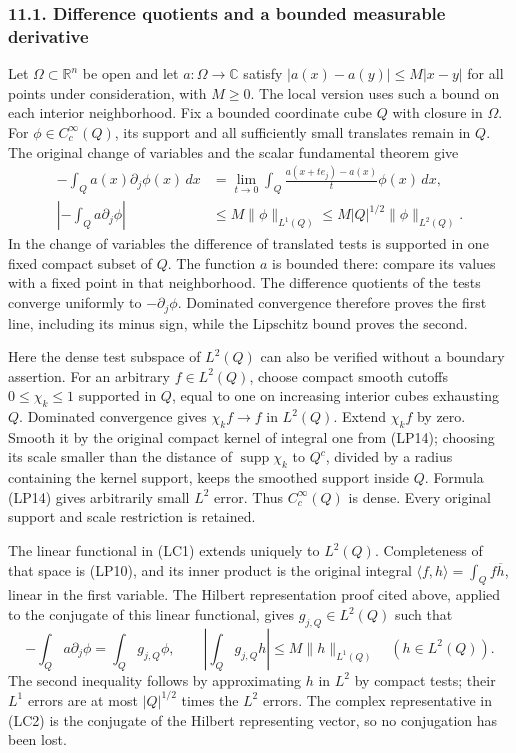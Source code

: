 \documentclass[
  11pt,
]{article}
\begin{document}
\subsubsection{11.1. Difference quotients and a bounded measurable
derivative}\label{difference-quotients-and-a-bounded-measurable-derivative}

Let \(\Omega\subset\mathbb R^n\) be open and let
\(a:\Omega\to\mathbb C\) satisfy \(|a(x)-a(y)|\leq M|x-y|\) for all
points under consideration, with \(M\geq0\). The local version uses such
a bound on each interior neighborhood. Fix a bounded coordinate cube
\(Q\) with closure in \(\Omega\). For \(\phi\in C_c^\infty(Q)\), its
support and all sufficiently small translates remain in \(Q\). The
original change of variables and the scalar fundamental theorem give \[
 \begin{split}
 -\int_Q a(x)\partial_j\phi(x)\,dx
 &=\lim_{t\to0}\int_Q
       \frac{a(x+t e_j)-a(x)}{t}\phi(x)\,dx,\\
 \left|-\int_Q a\partial_j\phi\right|
 &\leq M\|\phi\|_{L^1(Q)}
 \leq M|Q|^{1/2}\|\phi\|_{L^2(Q)} .
 \end{split}                                                   \tag{LC1}
\] In the change of variables the difference of translated tests is
supported in one fixed compact subset of \(Q\). The function \(a\) is
bounded there: compare its values with a fixed point in that
neighborhood. The difference quotients of the tests converge uniformly
to \(-\partial_j\phi\). Dominated convergence therefore proves the first
line, including its minus sign, while the Lipschitz bound proves the
second.

Here the dense test subspace of \(L^2(Q)\) can also be verified without
a boundary assertion. For an arbitrary \(f\in L^2(Q)\), choose compact
smooth cutoffs \(0\leq\chi_k\leq1\) supported in \(Q\), equal to one on
increasing interior cubes exhausting \(Q\). Dominated convergence gives
\(\chi_k f\to f\) in \(L^2(Q)\). Extend \(\chi_k f\) by zero. Smooth it
by the original compact kernel of integral one from (LP14); choosing its
scale smaller than the distance of \(\operatorname{supp}\chi_k\) to
\(Q^c\), divided by a radius containing the kernel support, keeps the
smoothed support inside \(Q\). Formula (LP14) gives arbitrarily small
\(L^2\) error. Thus \(C_c^\infty(Q)\) is dense. Every original support
and scale restriction is retained.

The linear functional in (LC1) extends uniquely to \(L^2(Q)\).
Completeness of that space is (LP10), and its inner product is the
original integral \(\langle f,h\rangle=\int_Q f\overline h\), linear in
the first variable. The Hilbert representation proof cited above,
applied to the conjugate of this linear functional, gives
\(g_{j,Q}\in L^2(Q)\) such that \[
 -\int_Q a\partial_j\phi=\int_Q g_{j,Q}\phi,
 \qquad
 \left|\int_Q g_{j,Q}h\right|\leq M\|h\|_{L^1(Q)}
                         \quad(h\in L^2(Q)).
                                                               \tag{LC2}
\] The second inequality follows by approximating \(h\) in \(L^2\) by
compact tests; their \(L^1\) errors are at most \(|Q|^{1/2}\) times the
\(L^2\) errors. The complex representative in (LC2) is the conjugate of
the Hilbert representing vector, so no conjugation has been lost.
\end{document}
